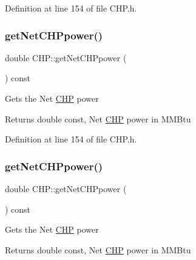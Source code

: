Definition at line 154 of file C\+H\+P.\+h.

\mbox{\label{class_c_h_p_a317f3df613b61f401bc5c4b69fddd0cf}} 
\subsubsection{\texorpdfstring{get\+Net\+C\+H\+Ppower()}{getNetCHPpower()}\hspace{0.1cm}{\footnotesize\ttfamily [2/3]}}
{\footnotesize\ttfamily double C\+H\+P\+::get\+Net\+C\+H\+Ppower (\begin{DoxyParamCaption}{ }\end{DoxyParamCaption}) const\hspace{0.3cm}{\ttfamily [inline]}}

Gets the Net \hyperlink{class_c_h_p}{C\+HP} power

\begin{DoxyReturn}{Returns}
double const, Net \hyperlink{class_c_h_p}{C\+HP} power in M\+M\+Btu 
\end{DoxyReturn}


Definition at line 154 of file C\+H\+P.\+h.

\mbox{\label{class_c_h_p_a317f3df613b61f401bc5c4b69fddd0cf}} 
\subsubsection{\texorpdfstring{get\+Net\+C\+H\+Ppower()}{getNetCHPpower()}\hspace{0.1cm}{\footnotesize\ttfamily [3/3]}}
{\footnotesize\ttfamily double C\+H\+P\+::get\+Net\+C\+H\+Ppower (\begin{DoxyParamCaption}{ }\end{DoxyParamCaption}) const\hspace{0.3cm}{\ttfamily [inline]}}

Gets the Net \hyperlink{class_c_h_p}{C\+HP} power

\begin{DoxyReturn}{Returns}
double const, Net \hyperlink{class_c_h_p}{C\+HP} power in M\+M\+Btu 
\end{DoxyReturn}



